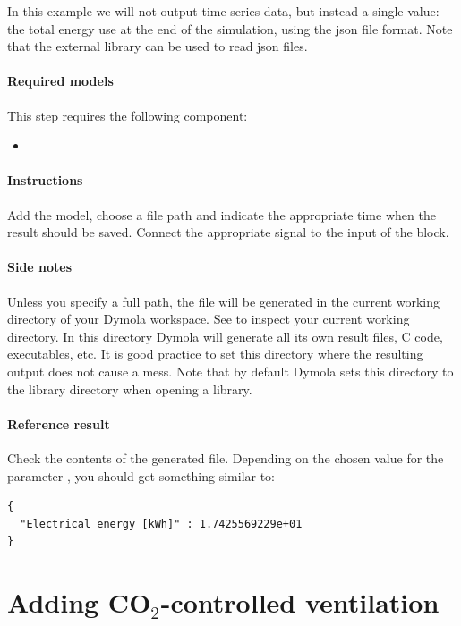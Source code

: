 \documentclass[10pt,a4paper]{article}
\begin{document}
In this example we will not output time series data, but instead a single value: the total
energy use at the end of the simulation, using the json file format. 
Note that the external library  can be used to read json files.


\paragraph{Required models}
This step requires the following component:
\begin{itemize}
\item {}
\end{itemize}

\paragraph{Instructions}
Add the model, choose a file path and indicate the appropriate time when 
the result should be saved.
Connect the appropriate signal to the input of the block.

\paragraph{Side notes}
Unless you specify a full path, the file will be generated in
the current working directory of your Dymola workspace.
See  to inspect your current
working directory.
In this directory Dymola will generate all its own result files, C code, executables, etc.
It is good practice to set this directory where the resulting output does not cause a mess.
Note that by default Dymola sets this directory to the library directory when opening a library.

\paragraph{Reference result}
Check the contents of the generated file. 
Depending on the chosen value for the parameter , 
you should get something similar to:
\begin{verbatim}
{
  "Electrical energy [kWh]" : 1.7425569229e+01
}
\end{verbatim}

\newpage

\section{Adding CO$_2$-controlled ventilation}
\end{document}
